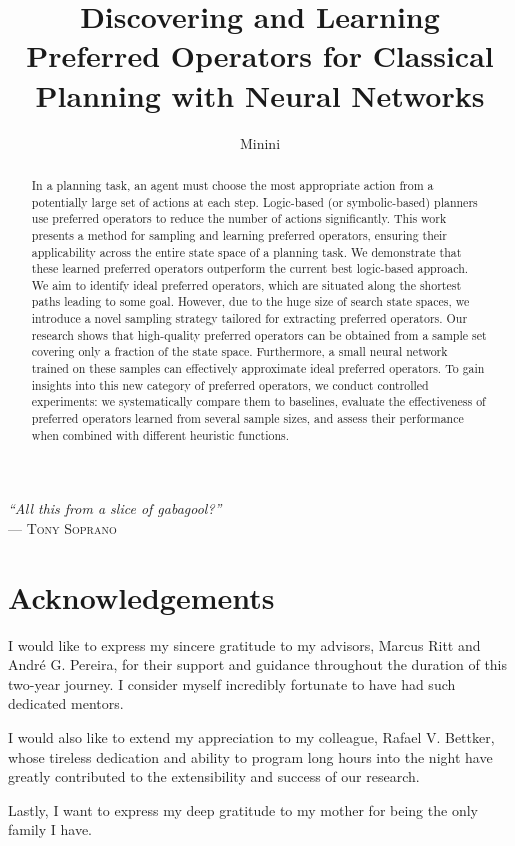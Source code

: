 \documentclass[ppgc,diss,english]{iiufrgs}
\title{Discovering and Learning Preferred Operators for Classical Planning with Neural Networks}
\author{Minini}{Pedro Probst}
\begin{document}
\maketitle

\clearpage
\begin{flushright}
\mbox{}\vfill
{\sffamily\itshape
    ``All this from a slice of gabagool?''\\}
--- \textsc{Tony Soprano}
\end{flushright}

\chapter*{Acknowledgements}

I would like to express my sincere gratitude to my advisors, Marcus Ritt and André G. Pereira, for their support and guidance throughout the duration of this two-year journey. I consider myself incredibly fortunate to have had such dedicated mentors.

I would also like to extend my appreciation to my colleague, Rafael V. Bettker, whose tireless dedication and ability to program long hours into the night have greatly contributed to the extensibility and success of our research.

Lastly, I want to express my deep gratitude to my mother for being the only family I have.

\begin{abstract}
In a planning task, an agent must choose the most appropriate action from a potentially large set of actions at each step. Logic-based (or symbolic-based) planners use preferred operators to reduce the number of actions significantly. This work presents a method for sampling and learning preferred operators, ensuring their applicability across the entire state space of a planning task. We demonstrate that these learned preferred operators outperform the current best logic-based approach.
We aim to identify ideal preferred operators, which are situated along the shortest paths leading to some goal. However, due to the huge size of search state spaces, we introduce a novel sampling strategy tailored for extracting preferred operators. Our research shows that high-quality preferred operators can be obtained from a sample set covering only a fraction of the state space. Furthermore, a small neural network trained on these samples can effectively approximate ideal preferred operators.
To gain insights into this new category of preferred operators, we conduct controlled experiments: we systematically compare them to baselines, evaluate the effectiveness of preferred operators learned from several sample sizes, and assess their performance when combined with different heuristic functions.
\end{abstract}
\end{document}
